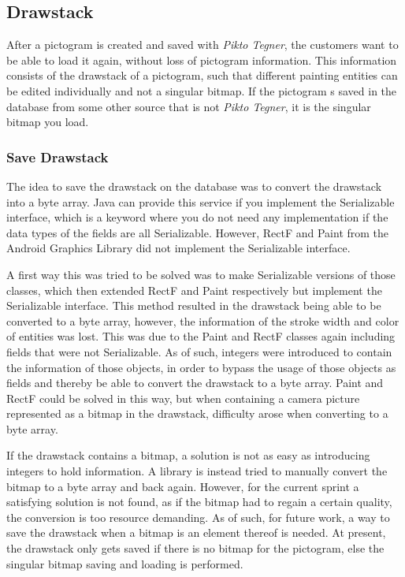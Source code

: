 \subsection{Drawstack}
After a pictogram is created and saved with \textit{Pikto Tegner}, the customers want to be able to load it again, without loss of pictogram information.
This information consists of the drawstack of a pictogram, such that different painting entities can be edited individually and not a singular bitmap.
If the pictogram s saved in the database from some other source that is not \textit{Pikto Tegner}, it is the singular bitmap you load.

\subsubsection*{Save Drawstack}
The idea to save the drawstack on the database was to convert the drawstack into a byte array.
Java can provide this service if you implement the Serializable interface, which is a keyword where you do not need any implementation if the data types of the fields are all Serializable.
However, RectF and Paint from the Android Graphics Library did not implement the Serializable interface.

A first way this was tried to be solved was to make Serializable versions of those classes, which then extended RectF and Paint respectively but implement the Serializable interface.
This method resulted in the drawstack being able to be converted to a byte array, however, the information of the stroke width and color of entities was lost.
This was due to the Paint and RectF classes again including fields that were not Serializable.
As of such, integers were introduced to contain the information of those objects, in order to bypass the usage of those objects as fields and thereby be able to convert the drawstack to a byte array.
Paint and RectF could be solved in this way, but when containing a camera picture represented as a bitmap in the drawstack, difficulty arose when converting to a byte array.

If the drawstack contains a bitmap, a solution is not as easy as introducing integers to hold information.
A library is instead tried to manually convert the bitmap to a byte array and back again.
However, for the current sprint a satisfying solution is not found, as if the bitmap had to regain a certain quality, the conversion is too resource demanding.
As of such, for future work, a way to save the drawstack when a bitmap is an element thereof is needed.
At present, the drawstack only gets saved if there is no bitmap for the pictogram, else the singular bitmap saving and loading is performed.

